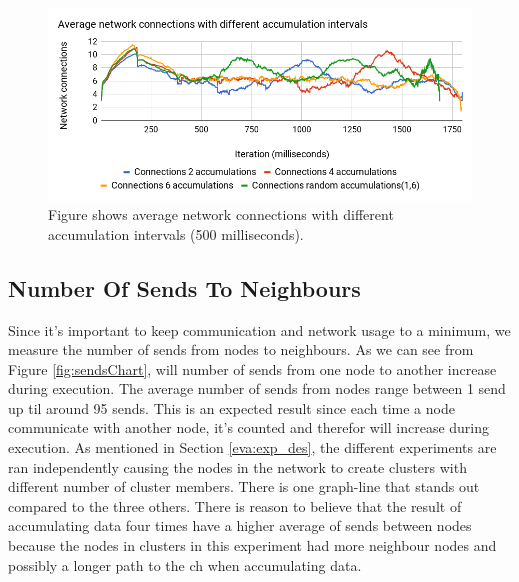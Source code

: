 \documentclass[USenglish]{uit-thesis}
\begin{document}


\begin{figure} [ht]
\centering
\includegraphics[width=\textwidth]{netconnChart.png}
\caption{Figure shows average network connections with different accumulation intervals (500 milliseconds).}
\label{fig:netconnChart}
\end{figure}


\newpage 

\subsection{Number Of Sends To Neighbours}
Since it's important to keep communication and network usage to a minimum, we measure the number of sends from nodes to neighbours. 
As we can see from Figure \ref{fig:sendsChart}, will number of sends from one node to another increase during execution. The average number of sends from nodes range between 1 send up til around 95 sends. This is an expected result since each time a node communicate with another node, it's counted and therefor will increase during execution.
As mentioned in Section \ref{eva:exp_des}, the different experiments are ran independently causing the nodes in the network to create clusters with different number of cluster members. There is one graph-line that stands out compared to the three others. There is reason to believe that the result of accumulating data four times have a higher average of sends between nodes because the nodes in clusters in this experiment had more neighbour nodes and possibly a longer path to the \gls{ch} when accumulating data.
\end{document}
